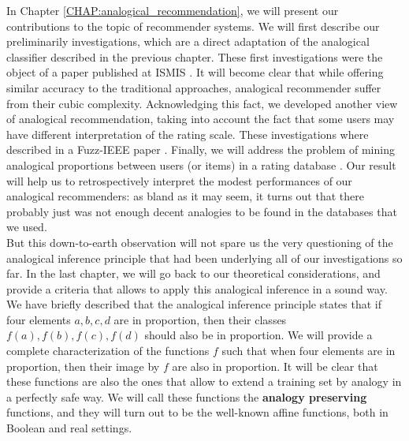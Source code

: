 In Chapter \ref{CHAP:analogical_recommendation}, we will present our
contributions to the topic of recommender systems. We will first describe our
preliminarily investigations, which are a direct adaptation of the analogical
classifier described in the previous chapter. These first investigations were
the object of a paper published at ISMIS \cite{HugPraRicISMIS15}. It will
become clear that while offering similar accuracy to the traditional
approaches, analogical recommender suffer from their cubic complexity.
Acknowledging this fact, we developed another view of analogical
recommendation, taking into account the fact that some users may have different
interpretation of the rating scale. These investigations where described in a
Fuzz-IEEE paper \cite{HugPraRicSerFuzzIEEE16}. Finally, we will address the
problem of mining analogical proportions between users (or items) in a rating
database \cite{HugPraRicSerLFA16}. Our result will help us to retrospectively
interpret the modest performances of our analogical recommenders: as bland as
it may seem, it turns out that there probably just was not enough decent
analogies to be found in the databases that we used.\\

But this down-to-earth observation will not spare us the very questioning of
the analogical inference principle that had been underlying all of our
investigations so far. In the last chapter, we will go back to our theoretical
considerations, and provide a criteria that allows to apply this analogical
inference in a sound way. We have briefly described that the analogical
inference principle states that if four elements $a, b, c, d$ are in proportion,
then their classes $f(a), f(b), f(c), f(d)$ should also be in proportion. We
will provide a complete characterization of the functions $f$ such that when
four elements are in proportion, then their image by $f$ are also in
proportion. It will be clear that these functions are also the ones that allow
to extend a training set by analogy in a perfectly safe way. We will call these
functions the \textbf{analogy preserving} functions, and they will turn out to
be the well-known affine functions, both in Boolean and real settings.
